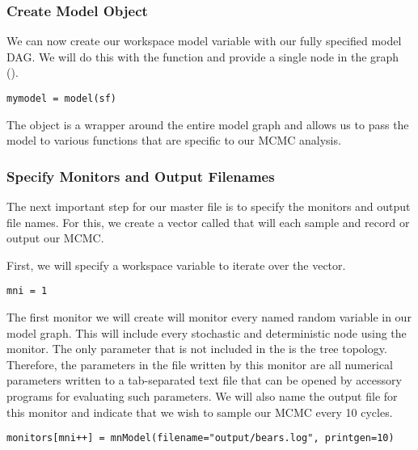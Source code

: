 \medskip
\subsubsection{Create Model Object}\label{subsub:Exercise-ModObj}

We can now create our workspace model variable with our fully specified model DAG. 
We will do this with the  function and provide a single node in the graph ().
{\tt \begin{snugshade*}
\begin{lstlisting}
mymodel = model(sf)
\end{lstlisting}
\end{snugshade*}}

The object  is a wrapper around the entire model graph and allows us to pass the model to various functions that are specific to our MCMC analysis.

\medskip
\subsubsection{Specify Monitors and Output Filenames}\label{subsub:Exercise-Monitors}

The next important step for our master \Rev file is to specify the monitors and output file names.
For this, we create a vector called  that will each sample and record or output our MCMC. 

First, we will specify a workspace variable to iterate over the  vector.
{\tt \begin{snugshade*}
\begin{lstlisting}
mni = 1
\end{lstlisting}
\end{snugshade*}}

The first monitor we will create will monitor every named random variable in our model graph. 
This will include every stochastic and deterministic node using the  monitor.
The only parameter that is not included in the  is the tree topology. 
Therefore, the parameters in the file written by this monitor are all numerical parameters written to a tab-separated text file that can be opened by accessory programs for evaluating such parameters.
We will also name the output file for this monitor and indicate that we wish to sample our MCMC every 10 cycles.
{\tt \begin{snugshade*}
\begin{lstlisting}
monitors[mni++] = mnModel(filename="output/bears.log", printgen=10)
\end{lstlisting}
\end{snugshade*}}

